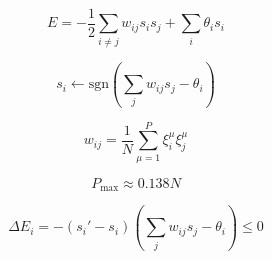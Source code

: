 
\begin{equation}
E = -\frac{1}{2} \sum_{i \neq j} w_{ij} s_i s_j + \sum_{i} \theta_i s_i
\end{equation}

\begin{equation}
s_i \leftarrow \text{sgn}\left( \sum_{j} w_{ij} s_j - \theta_i \right)
\end{equation}

\begin{equation}
w_{ij} = \frac{1}{N} \sum_{\mu=1}^{P} \xi_i^\mu \xi_j^\mu
\end{equation}

\begin{equation}
P_{\text{max}} \approx 0.138 N
\end{equation}

\begin{equation}
\Delta E_i = -\left( s_i' - s_i \right) \left( \sum_{j} w_{ij} s_j - \theta_i \right) \le 0
\end{equation}